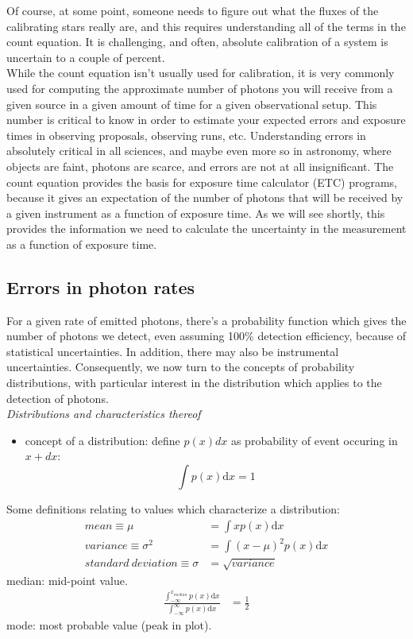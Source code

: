 \documentclass[12pt]{article}
\begin{document}
\noindent Of course, at some point, someone needs to figure out what
the fluxes of the calibrating stars really are, and this requires
understanding all of the terms in the count equation. It is
challenging, and often, absolute calibration of a system is uncertain
to a couple of percent.\\

\noindent While the count equation isn't usually used for calibration,
it is very commonly used for computing the approximate number of
photons you will receive from a given source in a given amount of time
for a given observational setup. This number is critical to know in
order to estimate your expected errors and exposure times in observing
proposals, observing runs, etc. Understanding errors in absolutely
critical in all sciences, and maybe even more so in astronomy, where
objects are faint, photons are scarce, and errors are not at all
insignificant. The count equation provides the basis for exposure time
calculator (ETC) programs, because it gives an expectation of the
number of photons that will be received by a given instrument as a
function of exposure time. As we will see shortly, this provides the
information we need to calculate the uncertainty in the measurement as
a function of exposure time.

\subsection*{Errors in photon rates}
For a given rate of emitted photons, there's a probability function
which gives the number of photons we detect, even assuming 100\%
detection efficiency, because of statistical uncertainties. In
addition, there may also be instrumental uncertainties. Consequently,
we now turn to the concepts of probability distributions, with
particular interest in the distribution which applies to the detection
of photons.\\

\noindent \emph{Distributions and characteristics thereof}
\begin{itemize}
    \item concept of a distribution: define $p(x)dx$ as probability of
    event occuring in $x + dx$:
    \begin{equation*}
        \int p(x)\textrm{d}x = 1
    \end{equation*}
\end{itemize}
Some definitions relating to values which characterize a distribution:
\begin{align*}
    mean \equiv \mu &= \int xp(x)\textrm{d}x \\
    variance \equiv \sigma^2 &= \int (x-\mu)^2 p(x)\textrm{d}x \\
    standard\ deviation \equiv \sigma &= \sqrt{variance}
\end{align*}
median: mid-point value.
\begin{align*}
    \frac{ \int_{-\infty}^{x_{median}} p(x)\textrm{d}x }
    { \int_{-\infty}^{\infty} p(x)\textrm{d}x }
    &= \frac{1}{2}
\end{align*}
mode: most probable value (peak in plot).
\end{document}
